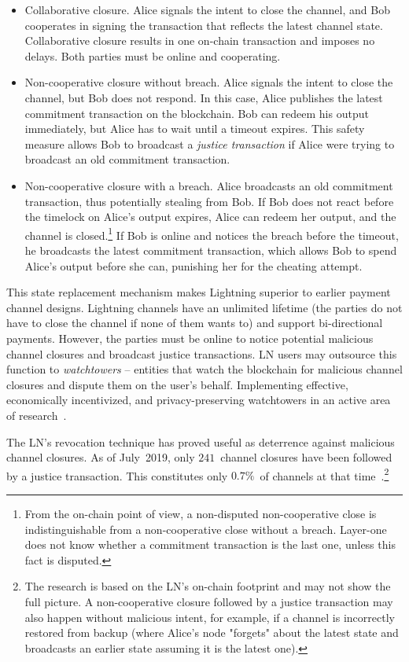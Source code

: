 \begin{itemize}
	\item Collaborative closure. Alice signals the intent to close the channel, and Bob cooperates in signing the transaction that reflects the latest channel state. Collaborative closure results in one on-chain transaction and imposes no delays. Both parties must be online and cooperating.
	\item Non-cooperative closure without breach. Alice signals the intent to close the channel, but Bob does not respond. In this case, Alice publishes the latest commitment transaction on the blockchain. Bob can redeem his output immediately, but Alice has to wait until a timeout expires. This safety measure allows Bob to broadcast a \textit{justice transaction} if Alice were trying to broadcast an old commitment transaction.
	\item Non-cooperative closure with a breach. Alice broadcasts an old commitment transaction, thus potentially stealing from Bob. If Bob does not react before the timelock on Alice's output expires, Alice can redeem her output, and the channel is closed.\footnote{From the on-chain point of view, a non-disputed non-cooperative close is indistinguishable from a non-cooperative close without a breach. Layer-one does not know whether a commitment transaction is the last one, unless this fact is disputed.} If Bob is online and notices the breach before the timeout, he broadcasts the latest commitment transaction, which allows Bob to spend Alice's output before she can, punishing her for the cheating attempt.
\end{itemize}

This state replacement mechanism makes Lightning superior to earlier payment channel designs.
Lightning channels have an unlimited lifetime (the parties do not have to close the channel if none of them wants to) and support bi-directional payments.
However, the parties must be online to notice potential malicious channel closures and broadcast justice transactions.
LN users may outsource this function to \textit{watchtowers} -- entities that watch the blockchain for malicious channel closures and dispute them on the user's behalf.
Implementing effective, economically incentivized, and privacy-preserving watchtowers in an active area of research~\cite{McCorry2019}.

The LN's revocation technique has proved useful as deterrence against malicious channel closures.
As of July~2019, only $241$~channel closures have been followed by a justice transaction.
This constitutes only $0.7\%$~of channels at that time~\cite{BitMEXLN3}.\footnote{The research is based on the LN's on-chain footprint and may not show the full picture. A non-cooperative closure followed by a justice transaction may also happen without malicious intent, for example, if a channel is incorrectly restored from backup (where Alice's node "forgets" about the latest state and broadcasts an earlier state assuming it is the latest one).}


